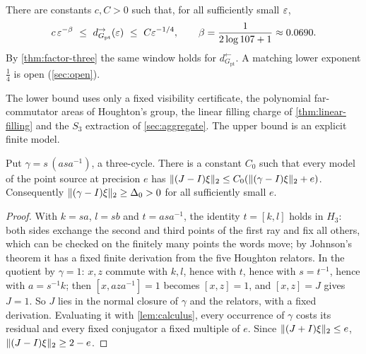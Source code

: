 \begin{theorem}\label{thm:point-window}
There are constants $c,C>0$ such that, for all sufficiently small $\varepsilon$,
\[
c\,\eps^{-\beta}\ \le\ d_{G_{\mathrm{pt}}}^\to(\eps)\ \le\ C\eps^{-1/4},\qquad\beta=\frac1{2\log107+1}\approx0.0690 .
\]
By \cref{thm:factor-three} the same window holds for $d^\leftarrow_{G_{\mathrm{pt}}}$. A matching lower exponent $\frac14$ is open
(\cref{sec:open}).
\end{theorem}

The lower bound uses only a fixed visibility certificate, the polynomial far-commutator areas of Houghton's group, the linear
filling charge of \cref{thm:linear-filling} and the $S_3$ extraction of \cref{sec:aggregate}. The upper bound is an explicit
finite model.

\begin{lemma}\label{lem:point-visibility}
Put $\gamma=s\,(asa^{-1})$, a three-cycle. There is a constant $C_0$ such that every model of the point source at precision $e$
has $\lVert (J-I)\xi\rVert_2\le C_0(\lVert (\gamma-I)\xi\rVert_2+e)$. Consequently $\lVert (\gamma-I)\xi\rVert_2\ge\Delta_0>0$ for all sufficiently small $e$.
\end{lemma}

\begin{proof}
With $k=sa$, $l=sb$ and $t=asa^{-1}$, the identity $t=[k,l]$ holds in $H_3$: both sides exchange the second and third points of
the first ray and fix all others, which can be checked on the finitely many points the words move; by Johnson's theorem it has
a fixed finite derivation from the five Houghton relators. In the quotient by $\gamma=1$: $x,z$ commute with $k,l$, hence with $t$,
hence with $s=t^{-1}$, hence with $a=s^{-1}k$; then $[x,aza^{-1}]=1$ becomes $[x,z]=1$, and $[x,z]=J$ gives $J=1$. So $J$ lies in the
normal closure of $\gamma$ and the relators, with a fixed derivation. Evaluating it with \cref{lem:calculus}, every occurrence of
$\gamma$ costs its residual and every fixed conjugator a fixed multiple of $e$. Since $\lVert (J+I)\xi\rVert_2\le e$, $\lVert (J-I)\xi\rVert_2\ge2-e$.
\end{proof}

